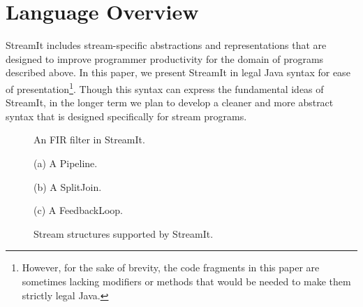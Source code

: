 
\section{Language Overview}
\label{sec:overview}

StreamIt includes stream-specific abstractions and representations
that are designed to improve programmer productivity for the domain of
programs described above.  In this paper, we present StreamIt in legal
Java syntax for ease of presentation\footnote{However, for the sake of
brevity, the code fragments in this paper are sometimes lacking
modifiers or methods that would be needed to make them strictly legal
Java.}.  Though this syntax can express the fundamental ideas of
StreamIt, in the longer term we plan to develop a cleaner and more
abstract syntax that is designed specifically for stream programs.

\begin{figure}[t]
\begin{minipage}{2.05in}
\vspace{-6pt}
\vspace{-24pt}
\caption{\protect\small An FIR filter in StreamIt.~~~~~
\protect\label{fig:firstreamit}}
\end{minipage}
\begin{minipage}{2.75in}
\centering
\vspace{10pt}

(a) A Pipeline. \\
\vspace{10pt}

(b) A SplitJoin. \\
\vspace{10pt}

(c) A FeedbackLoop. \\
\caption{\protect\small Stream structures supported by StreamIt.
\protect\label{fig:structuresp}
}
\end{minipage}
\vspace{-18pt}
\end{figure}

